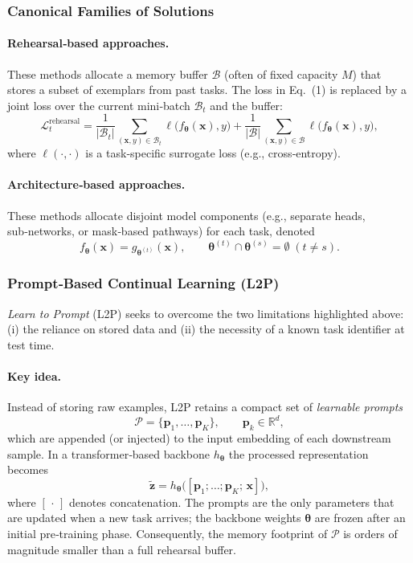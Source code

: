 \documentclass[12pt, a4paper]{article}
\begin{document}
\subsubsection{Canonical Families of Solutions}
\paragraph{Rehearsal‑based approaches.}
These methods allocate a memory buffer $\mathcal B$ (often of fixed capacity $M$) that stores a subset of exemplars from past tasks. The loss in Eq.~(1) is replaced by a joint loss over the current mini‑batch $\mathcal B_{t}$ and the buffer:
\[
\mathcal L^{\text{rehearsal}}_{t}
   = \frac{1}{|\mathcal B_{t}|}\!\sum_{(\mathbf x,y)\in\mathcal B_{t}}\!\ell\bigl(f_{\boldsymbol\theta}(\mathbf x),y\bigr)
   +\frac{1}{|\mathcal B|}\!\sum_{(\mathbf x,y)\in\mathcal B}\!\ell\bigl(f_{\boldsymbol\theta}(\mathbf x),y\bigr),
\tag{3}
\]
where $\ell(\cdot,\cdot)$ is a task‑specific surrogate loss (e.g., cross‑entropy).  

\paragraph{Architecture‑based approaches.}
These methods allocate disjoint model components (e.g., separate heads, sub‑networks, or mask‑based pathways) for each task, denoted
\[
f_{\boldsymbol\theta}(\mathbf x) = g_{\boldsymbol\theta^{(t)}}(\mathbf x), \qquad 
\boldsymbol\theta^{(t)}\cap\boldsymbol\theta^{(s)}=\emptyset\;(t\neq s).
\tag{4}
\]

\subsubsection{Prompt‑Based Continual Learning (L2P)}
\emph{Learn to Prompt} (L2P) seeks to overcome the two limitations highlighted above: (i) the reliance on stored data and (ii) the necessity of a known task identifier at test time.

\paragraph{Key idea.}
Instead of storing raw examples, L2P retains a compact set of \emph{learnable prompts}
\[
\mathcal P = \{\mathbf p_{1},\dots ,\mathbf p_{K}\},\qquad 
\mathbf p_{k}\in\mathbb R^{d},
\tag{5}
\]
which are appended (or injected) to the input embedding of each downstream sample. In a transformer‑based backbone $h_{\boldsymbol\theta}$ the processed representation becomes
\[
\tilde{\mathbf z}
   = h_{\boldsymbol\theta}\bigl([\mathbf p_{1};\dots ;\mathbf p_{K};\,\mathbf x]\bigr),
\tag{6}
\]
where $[\,\cdot\,]$ denotes concatenation. The prompts are the only parameters that are updated when a new task arrives; the backbone weights $\boldsymbol\theta$ are frozen after an initial pre‑training phase. Consequently, the memory footprint of $\mathcal P$ is orders of magnitude smaller than a full rehearsal buffer.
\end{document}
